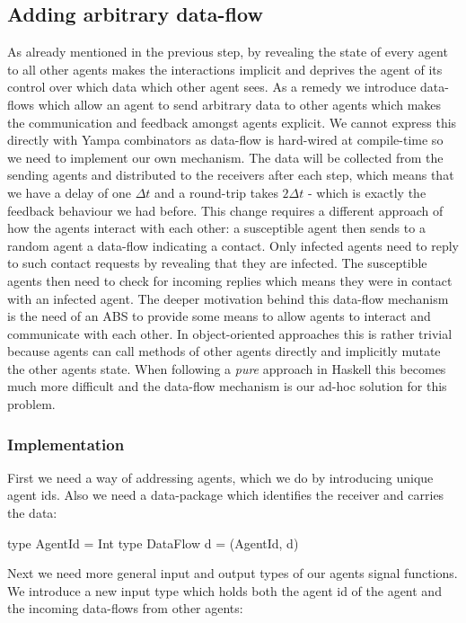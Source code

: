 \subsection{Adding arbitrary data-flow}
\label{sec:step3_dataflow}
As already mentioned in the previous step, by revealing the state of every agent to all other agents makes the interactions implicit and deprives the agent of its control over which data which other agent sees. As a remedy we introduce data-flows which allow an agent to send arbitrary data to other agents which makes the communication and feedback amongst agents explicit. We cannot express this directly with Yampa combinators as data-flow is hard-wired at compile-time so we need to implement our own mechanism. The data will be collected from the sending agents and distributed to the receivers after each step, which means that we have a delay of one $\Delta t$ and a round-trip takes $2 \Delta t$ - which is exactly the feedback behaviour we had before.
This change requires a different approach of how the agents interact with each other: a susceptible agent then sends to a random agent a data-flow indicating a contact. Only infected agents need to reply to such contact requests by revealing that they are infected. The susceptible agents then need to check for incoming replies which means they were in contact with an infected agent.
The deeper motivation behind this data-flow mechanism is the need of an ABS to provide some means to allow agents to interact and communicate with each other. In object-oriented approaches this is rather trivial because agents can call methods of other agents directly and implicitly mutate the other agents state. When following a \textit{pure} approach in Haskell this becomes much more difficult and the data-flow mechanism is our ad-hoc solution for this problem.

\subsubsection{Implementation}
First we need a way of addressing agents, which we do by introducing unique agent ids. Also we need a data-package which identifies the receiver and carries the data:
\begin{HaskellCode}
type AgentId     = Int
type DataFlow d = (AgentId, d)
\end{HaskellCode}

Next we need more general input and output types of our agents signal functions. We introduce a new input type which holds both the agent id of the agent and the incoming data-flows from other agents:

